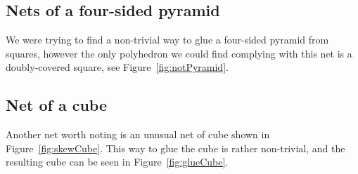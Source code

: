 \documentclass[a4paper,11pt]{article}
\begin{document}


\subsection*{Nets of a four-sided pyramid}

We were trying to find a non-trivial way to glue a four-sided pyramid from squares, however the only polyhedron we could find complying with this net is a doubly-covered square, see Figure~\ref{fig:notPyramid}.



\subsection*{Net of a cube}

Another net worth noting is an unusual net of cube shown in Figure~\ref{fig:skewCube}. This way to glue the cube is rather non-trivial, and the resulting cube can be seen in Figure~\ref{fig:glueCube}.



{}

\end{document}
